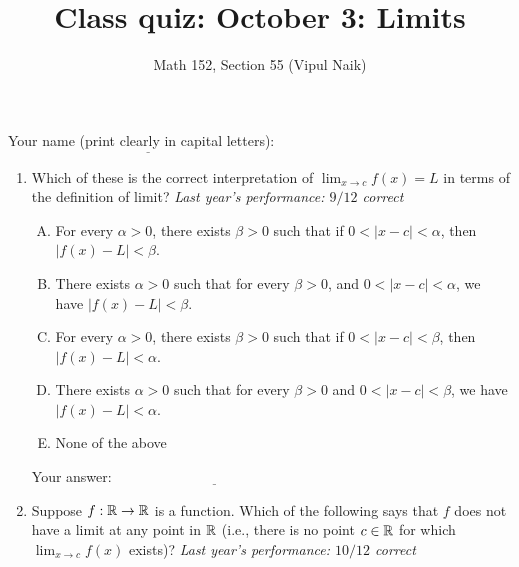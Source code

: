 \documentclass[10pt]{amsart}
\title{Class quiz: October 3: Limits}
\author{Math 152, Section 55 (Vipul Naik)}
\begin{document}
\maketitle

Your name (print clearly in capital letters): $\underline{\qquad\qquad\qquad\qquad\qquad\qquad\qquad\qquad\qquad\qquad}$

\begin{enumerate}

\item Which of these is the correct interpretation of $\lim_{x \to c}
  f(x) = L$ in terms of the definition of limit? {\em Last year's
  performance: $9/12$ correct}

  \begin{enumerate}[(A)]
  \item For every $\alpha > 0$, there exists $\beta > 0$ such that if
    $0 < |x - c| < \alpha$, then $|f(x) - L| < \beta$.
  \item There exists $\alpha > 0$ such that for every $\beta > 0$, and
    $0 < |x - c| < \alpha$, we have $|f(x) - L| < \beta$.
  \item For every $\alpha > 0$, there exists $\beta > 0$ such that if
    $0 < |x - c| < \beta$, then $|f(x) - L| < \alpha$.
  \item There exists $\alpha > 0$ such that for every $\beta > 0$ and
    $0 < |x - c| < \beta$, we have $|f(x) - L| < \alpha$.
  \item None of the above
  \end{enumerate}

  \vspace{0.1in}
  Your answer: $\underline{\qquad\qquad\qquad\qquad\qquad\qquad\qquad}$
  \vspace{0.5in}

\item Suppose $f:\mathbb{R} \to \mathbb{R}$ is a function. Which of the following says
  that $f$ does not have a limit at any point in $\mathbb{R}$ (i.e., there is
  no point $c \in \mathbb{R}$ for which $\lim_{x \to c} f(x)$ exists)? {\em
  Last year's performance: $10/12$ correct}


\end{enumerate}
\end{document}
